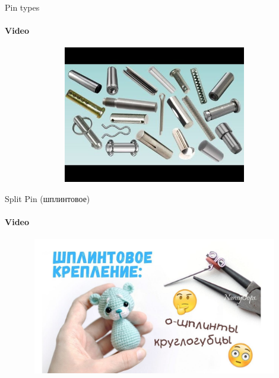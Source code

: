 \documentclass[aspectratio=169]{beamer}
\begin{document}
\begin{frame}[t]{Pin types}
    \framesubtitle{Video}
    \vspace{-0.6cm}
    \begin{figure}[H]
        \href{https://youtu.be/W-0ZV9zXpc0}{
            \centering\includegraphics[height=6cm,width=1\textwidth,keepaspectratio]{pin_types_video.jpg}}
        \label{fig:pin_types_video.jpg}
    \end{figure}
\end{frame}

\begin{frame}[t]{Split Pin (шплинтовое)}
    \framesubtitle{Video}
    \vspace{-0.6cm}
    \begin{figure}[H]
        \href{https://youtu.be/SpY0tJMY0hg}{
            \centering\includegraphics[height=6cm,width=1\textwidth,keepaspectratio]{splint_pin_video.jpg}}
        \label{fig:splint_pin_video.jpg}
    \end{figure}
\end{frame}
\end{document}
